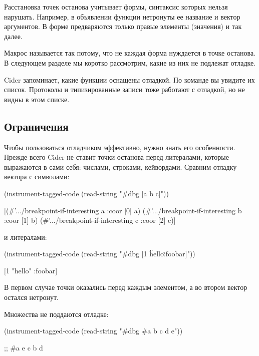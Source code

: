 Расстановка точек останова учитывает формы, синтаксис которых нельзя нарушать. Например, в объявлении функции нетронуты ее название и вектор аргументов. В форме  предваряются только правые элементы (значения) и так далее.

Макрос  называется так потому, что не каждая форма нуждается в точке останова. В следующем разделе мы коротко рассмотрим, какие из них не подлежат отладке.

Cider запоминает, какие функции оснащены отладкой. По команде  вы увидите их список. Протоколы и типизированные записи тоже работают с отладкой, но не видны в этом списке.

\subsection{Ограничения}

Чтобы пользоваться отладчиком эффективно, нужно знать его особенности. Прежде всего Cider не ставит точки останова перед литералами, которые выражаются в сами себя: числами, строками, кейвордами. Сравним отладку вектора с символами:

\begin{english}
  \begin{clojure}
(instrument-tagged-code
 (read-string "#dbg [a b c]"))

[(#'.../breakpoint-if-interesting a {:coor [0]} a)
 (#'.../breakpoint-if-interesting b {:coor [1]} b)
 (#'.../breakpoint-if-interesting c {:coor [2]} c)]
  \end{clojure}
\end{english}

\noindent
и литералами:

\begin{english}
  \begin{clojure}
(instrument-tagged-code
 (read-string "#dbg [1 \"hello\" :foobar]"))

[1 "hello" :foobar]
  \end{clojure}
\end{english}

В первом случае точки оказались перед каждым элементом, а во втором вектор остался нетронут.

Множества не поддаются отладке:

\begin{english}
  \begin{clojure}
(instrument-tagged-code
 (read-string "#dbg #{a b c d e}"))

;; #{a e c b d}
  \end{clojure}
\end{english}

